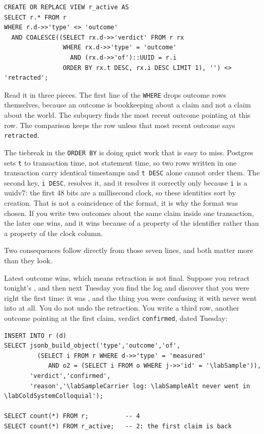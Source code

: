 \begin{verbatim}
CREATE OR REPLACE VIEW r_active AS
SELECT r.* FROM r
WHERE r.d->>'type' <> 'outcome'
  AND COALESCE((SELECT rx.d->>'verdict' FROM r rx
                WHERE rx.d->>'type' = 'outcome'
                  AND (rx.d->>'of')::UUID = r.i
                ORDER BY rx.t DESC, rx.i DESC LIMIT 1), '') <> 'retracted';
\end{verbatim}

Read it in three pieces. The first line of the \texttt{WHERE} drops outcome rows themselves, because an outcome is bookkeeping about a claim and not a claim about the world. The subquery finds the most recent outcome pointing at this row. The comparison keeps the row unless that most recent outcome says \texttt{retracted}.

The tiebreak in the \texttt{ORDER BY} is doing quiet work that is easy to miss. Postgres sets \texttt{t} to transaction time, not statement time, so two rows written in one transaction carry identical timestamps and \texttt{t DESC} alone cannot order them. The second key, \texttt{i DESC}, resolves it, and it resolves it correctly only because \texttt{i} is a uuidv7: the first 48 bits are a millisecond clock, so these identities sort by creation. That is not a coincidence of the format, it is why the format was chosen. If you write two outcomes about the same claim inside one transaction, the later one wins, and it wins because of a property of the identifier rather than a property of the clock column.

Two consequences follow directly from those seven lines, and both matter more than they look.

Latest outcome wins, which means retraction is not final. Suppose you retract tonight's \labScan{}, and then next Tuesday you find the \labSampleCarrier{} log and discover that you were right the first time: it was \labSample{}, and the thing you were confusing it with never went into \labColdSystemColloquial{} at all. You do not undo the retraction. You write a third row, another outcome pointing at the first claim, verdict \texttt{confirmed}, dated Tuesday:

\begin{verbatim}
INSERT INTO r (d)
SELECT jsonb_build_object('type','outcome','of',
         (SELECT i FROM r WHERE d->>'type' = 'measured'
            AND o2 = (SELECT i FROM o WHERE j->>'id' = '\labSample')),
       'verdict','confirmed',
       'reason','\labSampleCarrier log: \labSampleAlt never went in \labColdSystemColloquial');

SELECT count(*) FROM r;          -- 4
SELECT count(*) FROM r_active;   -- 2: the first claim is back
\end{verbatim}

